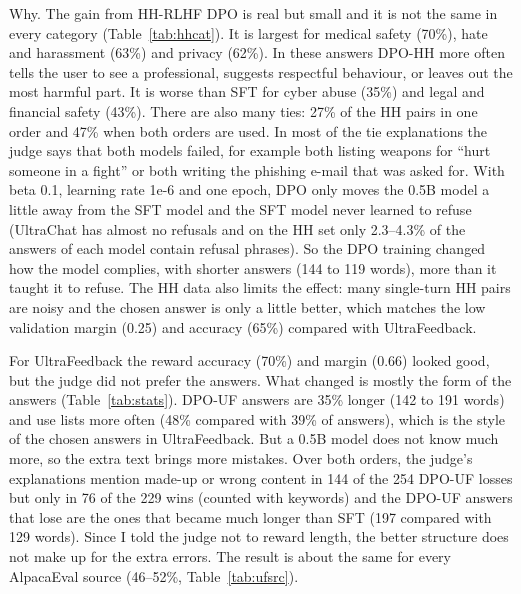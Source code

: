 \documentclass[11pt,a4paper]{article}
\begin{document}
Why. The gain from HH-RLHF DPO is real but small and it is not the same in every category (Table~\ref{tab:hhcat}). It is largest for medical
safety (70\%), hate and harassment (63\%) and privacy (62\%). In these answers DPO-HH more often tells the user to see a professional, suggests
respectful behaviour, or leaves out the most harmful part. It is worse than SFT for cyber abuse (35\%) and legal and financial safety (43\%).
There are also many ties: 27\% of the HH pairs in one order and 47\% when both orders are used. In most of the tie explanations the judge says
that both models failed, for example both listing weapons for ``hurt someone in a fight'' or both writing the phishing e-mail that was asked
for. With beta 0.1, learning rate 1e-6 and one epoch, DPO only moves the 0.5B model a little away from the SFT model and the SFT model never
learned to refuse (UltraChat has almost no refusals and on the HH set only 2.3--4.3\% of the answers of each model contain refusal phrases). So the
DPO training changed how the model complies, with shorter answers (144 to 119 words), more than it taught it to
refuse. The HH data also limits the effect: many single-turn HH pairs are noisy and the chosen answer is only a little better, which matches the
low validation margin (0.25) and accuracy (65\%) compared with UltraFeedback.

\begin{table}[!htbp]
\centering
\begin{minipage}[t]{0.48\linewidth}\vspace{0pt}
\end{minipage}\hfill
\begin{minipage}[t]{0.48\linewidth}\vspace{0pt}
\end{minipage}
\caption{DPO-HH vs.\ SFT by HH category (the 10 categories are split over the two halves). Both answer orders are used and the win rate
counts a tie as half a win.}
\label{tab:hhcat}
\end{table}

For UltraFeedback the reward accuracy (70\%) and margin (0.66) looked good, but the judge did not prefer the answers. What changed is mostly the
form of the answers (Table~\ref{tab:stats}). DPO-UF answers are 35\% longer (142 to 191 words) and use lists more often (48\% compared with 39\%
of answers), which is the style of the chosen answers in UltraFeedback. But a 0.5B model does not know much more, so the extra text brings
more mistakes. Over both orders, the judge's explanations mention made-up or wrong content in 144 of the 254 DPO-UF losses but only in 76 of the
229 wins (counted with keywords) and the DPO-UF answers that lose are the ones that became much longer than SFT (197 compared with 129 words).
Since I told the judge not to reward length, the better structure does not make up for the extra errors. The result is about the same for
every AlpacaEval source (46--52\%, Table~\ref{tab:ufsrc}).
\end{document}

